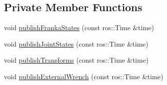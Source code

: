 \subsection*{Private Member Functions}
\begin{DoxyCompactItemize}
\item 
void \hyperlink{classfranka__control_1_1FrankaStateController_a70977857f43faff9127db1ebfeddc1b5}{publish\+Franka\+States} (const ros\+::\+Time \&time)
\item 
void \hyperlink{classfranka__control_1_1FrankaStateController_a37c67130a3359cb9cffa6af4a207615e}{publish\+Joint\+States} (const ros\+::\+Time \&time)
\item 
void \hyperlink{classfranka__control_1_1FrankaStateController_abcab70ff196a1751f625bc14a789ca82}{publish\+Transforms} (const ros\+::\+Time \&time)
\item 
void \hyperlink{classfranka__control_1_1FrankaStateController_a16421a8f95eb59bb9e94e4f011e33cb2}{publish\+External\+Wrench} (const ros\+::\+Time \&time)
\end{DoxyCompactItemize}
